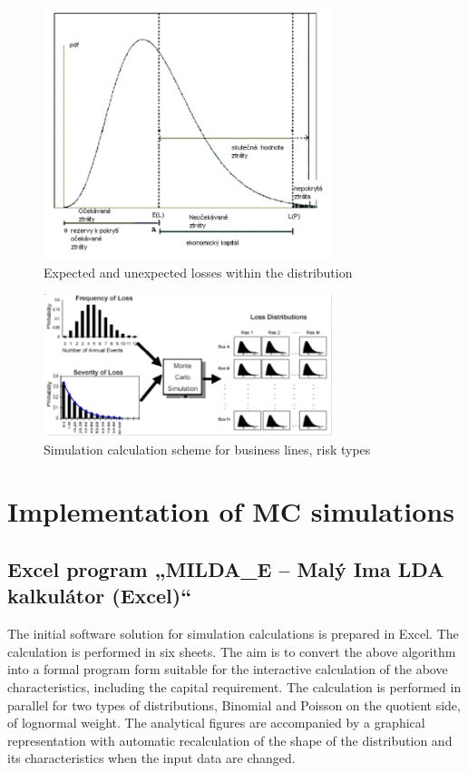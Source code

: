 \documentclass{article}
\begin{document}
\begin{figure}[H]
  \caption{Expected and unexpected losses within the distribution}
  \centering
    \includegraphics[width=0.75\textwidth]{ztraty}
\end{figure}


\begin{figure}[H]
  \caption{Simulation calculation scheme for business lines, risk types}
  \centering
    \includegraphics[width=0.75\textwidth]{schema}
\end{figure}




\section{Implementation of MC simulations}


\subsection{Excel program „MILDA\_E – Malý Ima LDA kalkulátor (Excel)“}

The initial software solution for simulation calculations is prepared in Excel. The calculation is performed in six sheets. The aim is to convert the above algorithm into a formal program form suitable for the interactive calculation of the above characteristics, including the capital requirement. The calculation is performed in parallel for two types of distributions, Binomial and Poisson on the quotient side, of lognormal weight. The analytical figures are accompanied by a graphical representation with automatic recalculation of the shape of the distribution and its characteristics when the input data are changed.
\end{document}
